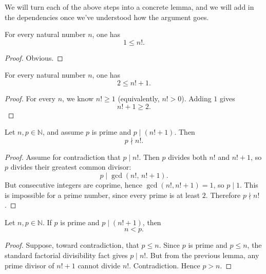 We will turn each of the above steps into a concrete lemma, and we will add in the dependencies once we've understood how the argument goes.

\begin{lemma}
\label{lem:one_le_fac}
\leanok
For every natural number $n$, one has
\[
1 \le n!.
\]
\end{lemma}
\begin{proof}
\leanok
Obvious.
\end{proof}

\begin{lemma}
\label{lem:two_le_fac_add_one}
\leanok
For every natural number $n$, one has
\[
2 \le n! + 1.
\]
\end{lemma}

\begin{proof}
\leanok
For every $n$, we know $n! \ge 1$ (equivalently, $n!>0$). Adding $1$ gives
\[
n!+1 \ge 2.
\]
\end{proof}

\begin{lemma}
Let $n,p\in\mathbb{N}$, and assume $p$ is prime and $p\mid (n!+1)$. Then
\[
p\nmid n!.
\]
\end{lemma}

\begin{proof}
Assume for contradiction that $p\mid n!$. Then $p$ divides both $n!$ and $n!+1$, so $p$ divides their greatest common divisor:
\[
p \mid \gcd(n!,\,n!+1).
\]
But consecutive integers are coprime, hence $\gcd(n!,n!+1)=1$, so $p\mid 1$. This is impossible for a prime number, since every prime is at least $2$. Therefore $p\nmid n!$.
\end{proof}

\begin{lemma}
Let $n,p\in\mathbb{N}$. If $p$ is prime and $p\mid (n!+1)$, then
\[
n<p.
\]
\end{lemma}

\begin{proof}
Suppose, toward contradiction, that $p\le n$. Since $p$ is prime and $p\le n$, the standard factorial divisibility fact gives $p\mid n!$. But from the previous lemma, any prime divisor of $n!+1$ cannot divide $n!$. Contradiction. Hence $p>n$.
\end{proof}

